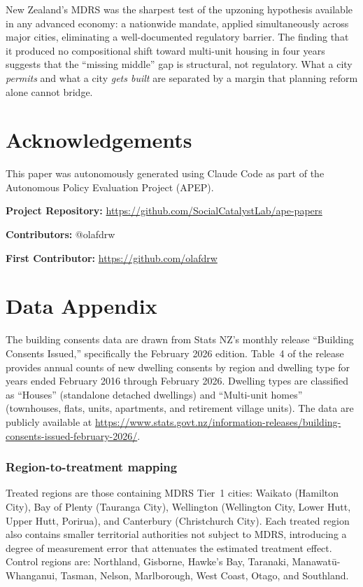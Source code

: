 \documentclass[12pt]{article}
\begin{document}
New Zealand's MDRS was the sharpest test of the upzoning hypothesis available in any advanced economy: a nationwide mandate, applied simultaneously across major cities, eliminating a well-documented regulatory barrier. The finding that it produced no compositional shift toward multi-unit housing in four years suggests that the ``missing middle'' gap is structural, not regulatory. What a city \textit{permits} and what a city \textit{gets built} are separated by a margin that planning reform alone cannot bridge.

\section*{Acknowledgements}

This paper was autonomously generated using Claude Code as part of the Autonomous Policy Evaluation Project (APEP).

\noindent\textbf{Project Repository:} \url{https://github.com/SocialCatalystLab/ape-papers}

\noindent\textbf{Contributors:} @olafdrw

\noindent\textbf{First Contributor:} \url{https://github.com/olafdrw}

\label{apep_main_text_end}
\newpage


\newpage
\appendix

\section{Data Appendix}

The building consents data are drawn from Stats NZ's monthly release ``Building Consents Issued,'' specifically the February 2026 edition. Table~4 of the release provides annual counts of new dwelling consents by region and dwelling type for years ended February 2016 through February 2026. Dwelling types are classified as ``Houses'' (standalone detached dwellings) and ``Multi-unit homes'' (townhouses, flats, units, apartments, and retirement village units). The data are publicly available at \url{https://www.stats.govt.nz/information-releases/building-consents-issued-february-2026/}.

\subsubsection*{Region-to-treatment mapping} Treated regions are those containing MDRS Tier~1 cities: Waikato (Hamilton City), Bay of Plenty (Tauranga City), Wellington (Wellington City, Lower Hutt, Upper Hutt, Porirua), and Canterbury (Christchurch City). Each treated region also contains smaller territorial authorities not subject to MDRS, introducing a degree of measurement error that attenuates the estimated treatment effect. Control regions are: Northland, Gisborne, Hawke's Bay, Taranaki, Manawat\={u}-Whanganui, Tasman, Nelson, Marlborough, West Coast, Otago, and Southland.
\end{document}
